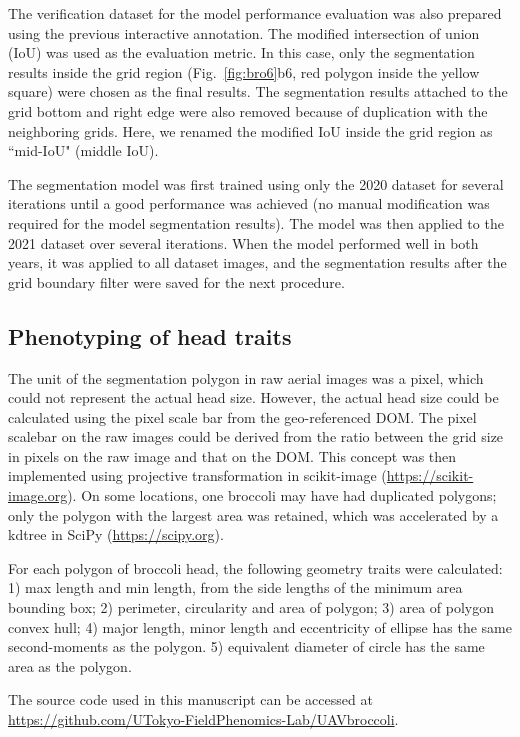 The verification dataset for the model performance evaluation was also prepared using the previous interactive annotation. The modified intersection of union (IoU) was used as the evaluation metric. In this case, only the segmentation results inside the grid region (Fig.~\ref{fig:bro6}b6, red polygon inside the yellow square) were chosen as the final results. The segmentation results attached to the grid bottom and right edge were also removed because of duplication with the neighboring grids. Here, we renamed the modified IoU inside the grid region as ``mid-IoU" (middle IoU).

The segmentation model was first trained using only the 2020 dataset for several iterations until a good performance was achieved (no manual modification was required for the model segmentation results). The model was then applied to the 2021 dataset over several iterations. When the model performed well in both years, it was applied to all dataset images, and the segmentation results after the grid boundary filter were saved for the next procedure.

\subsection{Phenotyping of head traits}\label{sec:pheno}

The unit of the segmentation polygon in raw aerial images was a pixel, which could not represent the actual head size. However, the actual head size could be calculated using the pixel scale bar from the geo-referenced DOM. The pixel scalebar on the raw images could be derived from the ratio between the grid size in pixels on the raw image and that on the DOM. This concept was then implemented using projective transformation in scikit-image (\url{https://scikit-image.org}). On some locations, one broccoli may have had duplicated polygons; only the polygon with the largest area was retained, which was accelerated by a \gls{kdtree} in SciPy (\url{https://scipy.org}).

For each polygon of broccoli head, the following geometry traits were calculated: 1) max length and min length, from the side lengths of the minimum area bounding box; 2) perimeter, circularity and area of polygon; 3) area of polygon convex hull; 4) major length, minor length and eccentricity of ellipse has the same second-moments as the polygon. 5) equivalent diameter of circle has the same area as the polygon.

The source code used in this manuscript can be accessed at \url{https://github.com/UTokyo-FieldPhenomics-Lab/UAVbroccoli}. %

